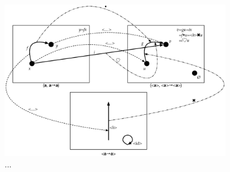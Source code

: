 \documentclass[a5paper,twoside,fleqn,draft]{jsbook}
\begin{document}
\begin{figure}
\begin{center}
\includegraphics[width=100mm]{fig/functor.eps}
\end{center}
\caption{...}
\label{fig:functor}
\end{figure}

\end{document}
